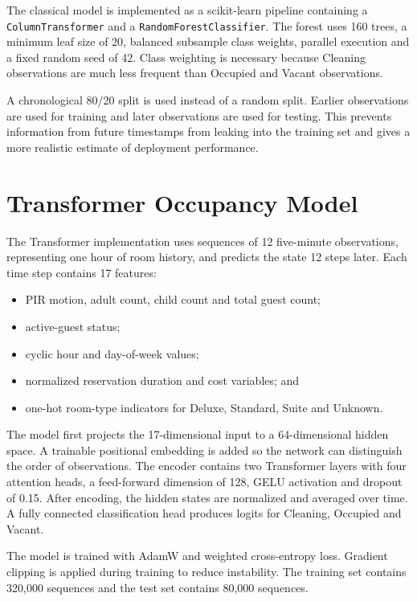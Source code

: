 The classical model is implemented as a scikit-learn pipeline containing a
\texttt{ColumnTransformer} and a \texttt{RandomForestClassifier}. The forest
uses 160 trees, a minimum leaf size of 20, balanced subsample class weights,
parallel execution and a fixed random seed of 42. Class weighting is necessary
because Cleaning observations are much less frequent than Occupied and Vacant
observations.

A chronological 80/20 split is used instead of a random split. Earlier
observations are used for training and later observations are used for testing.
This prevents information from future timestamps from leaking into the
training set and gives a more realistic estimate of deployment performance.

\section{Transformer Occupancy Model}

The Transformer implementation uses sequences of 12 five-minute observations,
representing one hour of room history, and predicts the state 12 steps later.
Each time step contains 17 features:

\begin{itemize}
    \item PIR motion, adult count, child count and total guest count;
    \item active-guest status;
    \item cyclic hour and day-of-week values;
    \item normalized reservation duration and cost variables; and
    \item one-hot room-type indicators for Deluxe, Standard, Suite and Unknown.
\end{itemize}

The model first projects the 17-dimensional input to a 64-dimensional hidden
space. A trainable positional embedding is added so the network can distinguish
the order of observations. The encoder contains two Transformer layers with
four attention heads, a feed-forward dimension of 128, GELU activation and
dropout of 0.15. After encoding, the hidden states are normalized and averaged
over time. A fully connected classification head produces logits for Cleaning,
Occupied and Vacant.

The model is trained with AdamW and weighted cross-entropy loss. Gradient
clipping is applied during training to reduce instability. The training set
contains 320,000 sequences and the test set contains 80,000 sequences.

